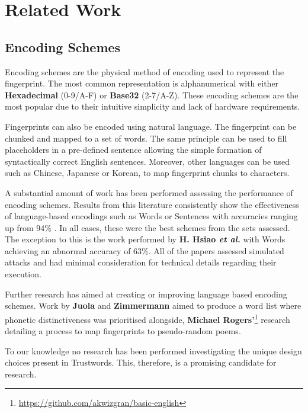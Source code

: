 \section{Related Work}

\subsection{Encoding Schemes}
Encoding schemes are the physical method of encoding used to represent the fingerprint. The most common representation is alphanumerical with either \textbf{Hexadecimal} (0-9/A-F) or \textbf{Base32} (2-7/A-Z). These encoding schemes are the most popular due to their intuitive simplicity and lack of hardware requirements.

Fingerprints can also be encoded using natural language. The fingerprint can be chunked and mapped to a set of words. The same principle can be used to fill placeholders in a pre-defined sentence allowing the simple formation of syntactically correct English sentences. Moreover, other languages can be used such as Chinese, Japanese or Korean, to map fingerprint chunks to characters.

A substantial amount of work has been performed assessing the performance of encoding schemes. Results from this literature consistently show the effectiveness of language-based encodings such as Words or Sentences with accuracies ranging up from 94\% \cite{dechand2016empirical}\cite{tan2017can}\cite{kainda2009usability}. In all cases, these were the best schemes from the sets assessed. The exception to this is the work performed by \textbf{H. Hsiao \textit{et al.}}\cite{hsiao2009study} with Words achieving an abnormal accuracy of 63\%. All of the papers assessed simulated attacks and had minimal consideration for technical details regarding their execution. 

Further research has aimed at creating or improving language based encoding schemes. Work by \textbf{Juola} and \textbf{Zimmermann} \cite{juola1996whole} aimed to produce a word list where phonetic distinctiveness was prioritised alongside, \textbf{Michael Rogers'}\footnote{\url{https://github.com/akwizgran/basic-english}} research detailing a process to map fingerprints to pseudo-random poems.

To our knowledge no research has been performed investigating the unique design choices present in Trustwords. This, therefore, is a promising candidate for research.